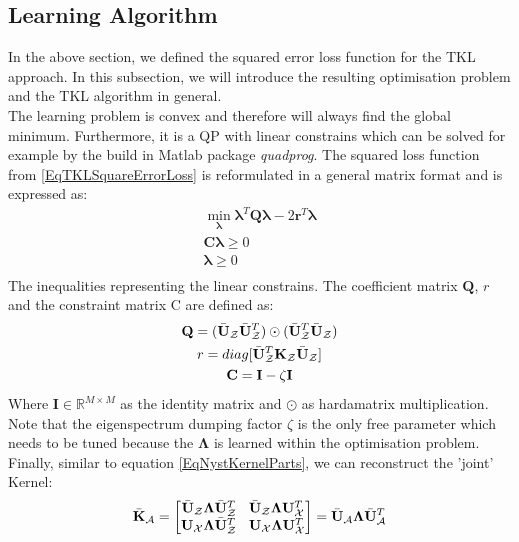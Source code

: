 \subsection{Learning Algorithm}\label{InSubSecLearnAlgo}
In the above section, we defined the squared error loss function for the \acs{TKL} approach.
In this subsection, we will introduce the resulting optimisation problem and the \acs{TKL} algorithm in general.\\
The learning problem is convex and therefore will always find the global minimum.
Furthermore, it is a \ac{QP} with linear constrains which can be solved for example by the build in Matlab package \textit{quadprog}.
The squared loss function from \eqref{EqTKLSquareErrorLoss} is reformulated in a general matrix format and is expressed as:\cite{Long.}
\begin{equation}\label{EqTklQP}
	\begin{gathered}
		\min_{\boldsymbol{\lambda}} \boldsymbol{\lambda}^T \mathbf{Q} \boldsymbol{\lambda} - 2\mathbf{r}^T\boldsymbol{\lambda}\\
		\mathbf{C}\boldsymbol{\lambda} \ge 0 \\
		\boldsymbol{\lambda} \ge 0 \\
	\end{gathered}
\end{equation}
The inequalities representing the linear constrains.
The coefficient matrix $\mathbf{Q}$, $r$ and the constraint matrix C are defined as:
\begin{equation}\label{EqTklQPCons}
		\begin{gathered}
			\mathbf{Q} = (\bar{\mathbf{U}}_\mathcal{Z} \bar{\mathbf{U}}_\mathcal{Z}^T)\odot (\bar{\mathbf{U}}_\mathcal{Z}^T \bar{\mathbf{U}}_\mathcal{Z})\\
			r = diag[\bar{\mathbf{U}}_\mathcal{Z}^T \mathbf{K}_\mathcal{Z} \bar{\mathbf{U}}_\mathcal{Z}]\\
			\mathbf{C} = \mathbf{I} - \zeta \mathbf{I}
		\end{gathered}
\end{equation}
Where $\mathbf{I} \in \mathbb{R}^{M\times M}$ as the identity matrix and $\odot$ as hardamatrix multiplication.
Note that the eigenspectrum dumping factor $\zeta$ is the only free parameter which needs to be tuned because the $\boldsymbol{\Lambda}$ is learned within the optimisation problem.\\
Finally, similar to equation \ref{EqNystKernelParts}, we can reconstruct the 'joint' Kernel:\cite{Long.}
\begin{equation}\label{EqTKLKernel}
	\bar{\mathbf{K}}_\mathcal{A} = 
	\begin{bmatrix}
	 \bar{\mathbf{U}}_\mathcal{Z} \boldsymbol{\Lambda} \bar{\mathbf{U}}_\mathcal{Z}^T \>\>\>\> \bar{\mathbf{U}}_\mathcal{Z} \boldsymbol{\Lambda} \mathbf{U}_\mathcal{X}^T \\
	 \mathbf{U}_\mathcal{X} \boldsymbol{\Lambda} \bar{\mathbf{U}}_\mathcal{Z}^T \>\>\>\> \mathbf{U}_\mathcal{X} \boldsymbol{\Lambda} \mathbf{U}_\mathcal{X}^T 
	\end{bmatrix}
	= 	 \bar{\mathbf{U}}_\mathcal{A} \boldsymbol{\Lambda} \bar{\mathbf{U}}_\mathcal{A}^T 
\end{equation}
